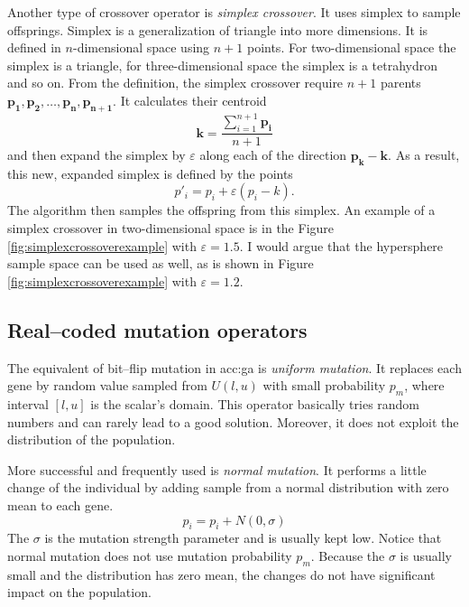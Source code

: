 Another type of crossover operator is \emph{simplex crossover}. It uses simplex to sample offsprings. Simplex is a generalization of triangle into more dimensions. It is defined in $n$-dimensional space using $n+1$ points. For two-dimensional space the simplex is a triangle, for three-dimensional space the simplex is a tetrahydron and so on. From the definition, the simplex crossover require $n+1$ parents $\mathbf{p_1}, \mathbf{p_2}, \dots, \mathbf{p_n}, \mathbf{p_{n+1}}$. It calculates their centroid
$$
\mathbf{k}=\frac{\sum_{i=1}^{n+1} \mathbf{p_i}}{n+1}
$$
and then expand the simplex by $\varepsilon$ along each of the direction $\mathbf{p_k} - \mathbf{k}$. As a result, this new, expanded simplex is defined by the points
\boldmath
$$
p'_i = p_i + \varepsilon\left( p_i - k \right).
$$
\unboldmath
The algorithm then samples the offspring from this simplex. An example of a simplex crossover in two-dimensional space is in the Figure \ref{fig:simplexcrossoverexample} with $\varepsilon=1.5$.
I would argue that the hypersphere sample space can be used as well, as is shown in Figure \ref{fig:simplexcrossoverexample} with $\varepsilon=1.2$.

\subsection{Real--coded mutation operators}

The equivalent of bit--flip mutation in \acrshort{acc:ga} is \emph{uniform mutation}. It replaces each gene by random value sampled from $U(l,u)$ with small probability $p_m$, where interval $\left[l,u\right]$ is the scalar's domain. This operator basically tries random numbers and can rarely lead to a good solution. Moreover, it does not exploit the distribution of the population.

More successful and frequently used is \emph{normal mutation}. It performs a little change of the individual by adding sample from a normal distribution with zero mean to each gene.
$$
p_i = p_i + N(0,\sigma)
$$
The $\sigma$ is the mutation strength parameter and is usually kept low. Notice that normal mutation does not use mutation probability $p_m$. Because the $\sigma$ is usually small and the distribution has zero mean, the changes do not have significant impact on the population.

